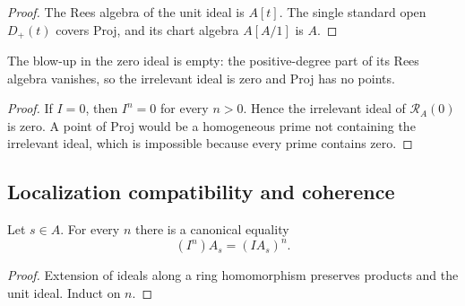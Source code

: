 \begin{proof}
  \leanok
  The Rees algebra of the unit ideal is $A[t]$.  The single standard open
  $D_+(t)$ covers Proj, and its chart algebra $A[A/1]$ is $A$.
\end{proof}

\begin{lemma}
  \label{lemma:nagata-affine-blowup-bot}

  The blow-up in the zero ideal is empty: the positive-degree part of its Rees
  algebra vanishes, so the irrelevant ideal is zero and Proj has no points.
\end{lemma}

\begin{proof}
  If $I=0$, then $I^n=0$ for every $n>0$.  Hence the irrelevant ideal of
  $\mathcal R_A(0)$ is zero.  A point of Proj would be a homogeneous prime not
  containing the irrelevant ideal, which is impossible because every prime
  contains zero.
\end{proof}

\subsection{Localization compatibility and coherence}

\begin{lemma}
  \label{lemma:nagata-localization-ideal-pow}
  \leanok

  Let $s\in A$.  For every $n$ there is a canonical equality
  \[
    (I^n)A_s=(IA_s)^n.
  \]
\end{lemma}

\begin{proof}
  \leanok
  Extension of ideals along a ring homomorphism preserves products and the
  unit ideal.  Induct on $n$.
\end{proof}

